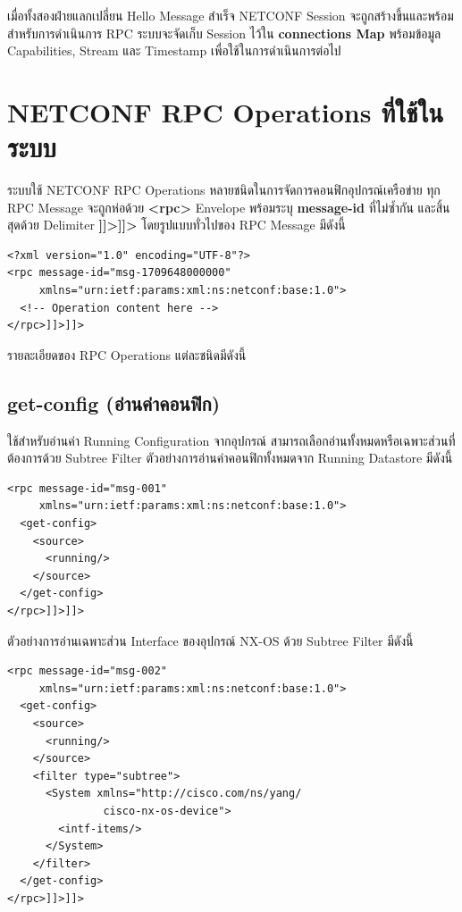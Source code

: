 \hspace*{1.3em}
เมื่อทั้งสองฝ่ายแลกเปลี่ยน Hello Message สำเร็จ NETCONF Session จะถูกสร้างขึ้นและพร้อมสำหรับการดำเนินการ RPC ระบบจะจัดเก็บ Session ไว้ใน \textbf{connections Map} พร้อมข้อมูล Capabilities, Stream และ Timestamp เพื่อใช้ในการดำเนินการต่อไป

\section{NETCONF RPC Operations ที่ใช้ในระบบ}
\hspace*{1.3em}
ระบบใช้ NETCONF RPC Operations หลายชนิดในการจัดการคอนฟิกอุปกรณ์เครือข่าย ทุก RPC Message จะถูกห่อด้วย \textbf{<rpc>} Envelope พร้อมระบุ \textbf{message-id} ที่ไม่ซ้ำกัน และสิ้นสุดด้วย Delimiter \textbf{]]>]]>} โดยรูปแบบทั่วไปของ RPC Message มีดังนี้

\begin{verbatim}
<?xml version="1.0" encoding="UTF-8"?>
<rpc message-id="msg-1709648000000"
     xmlns="urn:ietf:params:xml:ns:netconf:base:1.0">
  <!-- Operation content here -->
</rpc>]]>]]>
\end{verbatim}

\hspace*{1.3em}
รายละเอียดของ RPC Operations แต่ละชนิดมีดังนี้

\subsection{get-config (อ่านค่าคอนฟิก)}
\hspace*{1.3em}
ใช้สำหรับอ่านค่า Running Configuration จากอุปกรณ์ สามารถเลือกอ่านทั้งหมดหรือเฉพาะส่วนที่ต้องการด้วย Subtree Filter ตัวอย่างการอ่านค่าคอนฟิกทั้งหมดจาก Running Datastore มีดังนี้

\begin{verbatim}
<rpc message-id="msg-001"
     xmlns="urn:ietf:params:xml:ns:netconf:base:1.0">
  <get-config>
    <source>
      <running/>
    </source>
  </get-config>
</rpc>]]>]]>
\end{verbatim}

\hspace*{1.3em}
ตัวอย่างการอ่านเฉพาะส่วน Interface ของอุปกรณ์ NX-OS ด้วย Subtree Filter มีดังนี้

\begin{verbatim}
<rpc message-id="msg-002"
     xmlns="urn:ietf:params:xml:ns:netconf:base:1.0">
  <get-config>
    <source>
      <running/>
    </source>
    <filter type="subtree">
      <System xmlns="http://cisco.com/ns/yang/
               cisco-nx-os-device">
        <intf-items/>
      </System>
    </filter>
  </get-config>
</rpc>]]>]]>
\end{verbatim}


